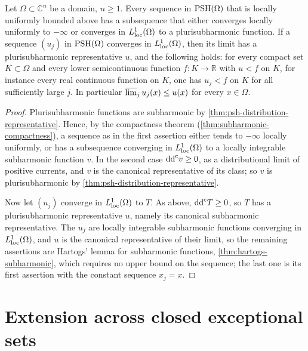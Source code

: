 \begin{theorem}\label{thm:psh-compactness-hartogs}
Let $\Omega\subset\mathbb C^n$ be a domain, $n\geq1$. Every sequence in $\mathrm{PSH}(\Omega)$ that is locally uniformly bounded above has a subsequence that either converges locally uniformly to $-\infty$ or converges in $L^1_{\mathrm{loc}}(\Omega)$ to a plurisubharmonic function. If a sequence $(u_j)$ in $\mathrm{PSH}(\Omega)$ converges in $L^1_{\mathrm{loc}}(\Omega)$, then its limit has a plurisubharmonic representative $u$, and the following holds: for every compact set $K\subset\Omega$ and every lower semicontinuous function $f\colon K\to\mathbb R$ with $u<f$ on $K$, for instance every real continuous function on $K$, one has $u_j<f$ on $K$ for all sufficiently large $j$. In particular $\varlimsup_j u_j(x)\le u(x)$ for every $x\in\Omega$.
\end{theorem}
\begin{proof}
Plurisubharmonic functions are subharmonic by \cref{thm:psh-distribution-representative}. Hence, by the compactness theorem (\cref{thm:subharmonic-compactness}), a sequence as in the first assertion either tends to $-\infty$ locally uniformly, or has a subsequence converging in $L^1_{\mathrm{loc}}(\Omega)$ to a locally integrable subharmonic function $v$. In the second case $\mathrm{dd}^{\mathrm{c}} v\geq0$, as a distributional limit of positive currents, and $v$ is the canonical representative of its class; so $v$ is plurisubharmonic by \cref{thm:psh-distribution-representative}.

Now let $(u_j)$ converge in $L^1_{\mathrm{loc}}(\Omega)$ to $T$. As above, $\mathrm{dd}^{\mathrm{c}} T\geq0$, so $T$ has a plurisubharmonic representative $u$, namely its canonical subharmonic representative. The $u_j$ are locally integrable subharmonic functions converging in $L^1_{\mathrm{loc}}(\Omega)$, and $u$ is the canonical representative of their limit, so the remaining assertions are Hartogs' lemma for subharmonic functions, \cref{thm:hartogs-subharmonic}, which requires no upper bound on the sequence; the last one is its first assertion with the constant sequence $x_j=x$.
\end{proof}





\section{Extension across closed exceptional sets}
\label{sec:psh-extension}

